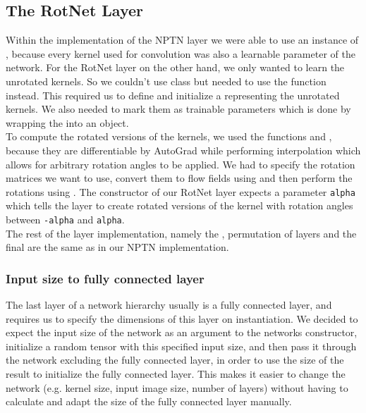 \documentclass{llncs}
\begin{document}
\subsection{The RotNet Layer}
Within the implementation of the NPTN layer we were able to use an instance of \nnConvLayer, because every kernel used for convolution was also a learnable parameter of the network.
For the RotNet layer on the other hand, we only wanted to learn the unrotated kernels. So we couldn't use \nnConvLayer class but needed to use the \nnConvFunction  function instead.
This required us to define and initialize a \nnTensor representing the unrotated kernels. We also needed to mark them as trainable parameters which is done by wrapping the \nnTensor into an \nnParameter object.\\
To compute the rotated versions of the kernels, we used the functions \nnaffinegrid and \nngridsample, because they are differentiable by AutoGrad while performing interpolation which allows for arbitrary rotation angles to be applied. We had to specify the rotation matrices we want to use, convert them to flow fields using \nnaffinegrid and then perform the rotations using \nngridsample. The constructor of our RotNet layer expects a parameter \nolinkurl{alpha} which tells the layer to create rotated versions of the kernel with rotation angles between \nolinkurl{-alpha} and \nolinkurl{alpha}.\\
The rest of the layer implementation, namely the \nnMaxPool, permutation of layers and the final \nnAvgPool are the same as in our NPTN implementation.



\subsubsection{Input size to fully connected layer}
The last layer of a network hierarchy usually is a fully connected layer, and \pytorch requires us to specify the dimensions of this layer on instantiation. We decided to expect the input size of the network as an argument to the networks constructor, initialize a random tensor with this specified input size, and then pass it through the network excluding the fully connected layer, in order to use the size of the result to initialize the fully connected layer. This makes it easier to change the network (e.g. kernel size, input image size, number of layers) without having to calculate and adapt the size of the fully connected layer manually. 
\end{document}
